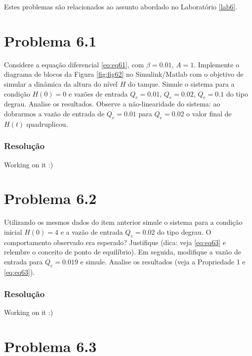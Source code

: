 \documentclass[
]{book}
\theoremstyle{definition}
\theoremstyle{definition}
\theoremstyle{definition}
\theoremstyle{remark}
\begin{document}
Estes problemas são relacionados ao assunto abordado no Laboratório \ref{lab6}.

\hypertarget{problema-6.1}{%
\section*{Problema 6.1}\label{problema-6.1}}

Considere a equação diferencial \eqref{eq:eq61}, com \(\beta = 0.01\), \(A = 1\). Implemente o diagrama de blocos da Figura \ref{fig:fig62} no Simulink/Matlab com o objetivo de simular a dinâmica da altura do nível \(H\) do tanque. Simule o sistema para a condição \(H(0) = 0\) e vazões de entrada \(Q_e = 0.01\), \(Q_e = 0.02\), \(Q_e = 0.1\) do tipo degrau. Analise os resultados. Observe a não-linearidade do sistema: ao dobrarmos a vazão de entrada de \(Q_e = 0.01\) para \(Q_e = 0.02\) o valor final de \(H(t)\) quadruplicou.

\hypertarget{resoluuxe7uxe3o}{%
\subsubsection*{Resolução}\label{resoluuxe7uxe3o}}

Working on it :)

\hypertarget{problema-6.2}{%
\section*{Problema 6.2}\label{problema-6.2}}

Utilizando os mesmos dados do item anterior simule o sistema para a condição inicial \(H(0)=4\) e a vazão de entrada \(Q_e = 0.02\) do tipo degrau. O comportamento observado era esperado? Justifique (dica: veja \eqref{eq:eq63} e relembre o conceito de ponto de equilíbrio). Em seguida, modifique a vazão de entrada para \(Q_e = 0.019\) e simule. Analise os resultados (veja a Propriedade 1 e \eqref{eq:eq63}).

\hypertarget{resoluuxe7uxe3o-1}{%
\subsubsection*{Resolução}\label{resoluuxe7uxe3o-1}}

Working on it :)

\hypertarget{problema-6.3}{%
\section*{Problema 6.3}\label{problema-6.3}}
\end{document}
